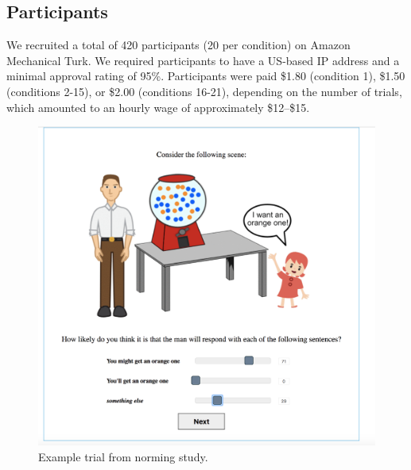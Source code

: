 \documentclass[lucida,biblatex]{sp} %
\begin{document}
\subsection{Participants}
We recruited a total of 420 participants 
(20 per condition) on Amazon Mechanical Turk. 
We required participants to have a US-based IP address and a minimal approval rating of 95\%.
Participants were paid \$1.80 (condition 1), \$1.50 (conditions 2-15),
or \$2.00 (conditions 16-21),
depending on the number of trials,
which amounted to an hourly wage of approximately \$12--\$15. 

\begin{figure}
\includegraphics[width=\textwidth, trim={0 0 1.1cm 0},clip]{plots/pre-test-example-trial.png} 
\caption{Example trial from norming study. \label{fig:norming-trial} }
\end{figure}
\end{document}

